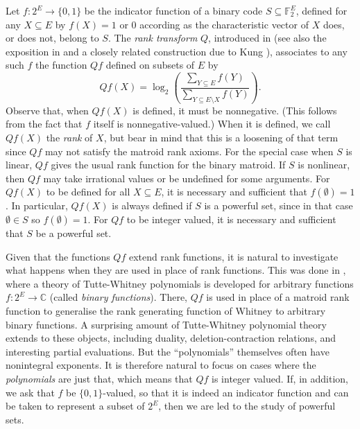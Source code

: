 \documentclass[12pt]{article}
\begin{document}
Let $f:2^E\rightarrow\{0,1\}$ be the indicator function of
a binary code $S\subseteq\mathbb{F}_2^E$, defined
for any $X\subseteq E$ by $f(X)=1$ or 0 according as the characteristic vector of $X$
does, or does not, belong to $S$.  The \textit{rank transform} $Q$, introduced in
\cite{farr93} (see also the exposition in \cite[\S3.6]{farr07a} and a closely related construction
due to Kung \cite{kung80}),
associates to any such $f$ the function $Qf$ defined on subsets of $E$ by
\begin{equation}
\label{eq:Qf}
Qf(X) = \log_2 \left(
\frac{\sum_{Y\subseteq E} f(Y)}{\sum_{Y\subseteq E\setminus X} f(Y)}
\right) .
\end{equation}
Observe that, when $Qf(X)$ is defined, it must be nonnegative.
(This follows from the fact that $f$ itself is nonnegative-valued.)
When it is defined, we call $Qf(X)$ the \textit{rank} of $X$, but bear in mind that this is
a loosening of that term since $Qf$ may not satisfy the matroid rank axioms.
For the special case when $S$ is linear, $Qf$ gives the usual rank function for the
binary matroid.  If $S$ is nonlinear, then $Qf$ may take irrational values
or be undefined for some arguments.
For $Qf(X)$ to be defined for all $X\subseteq E$, it is necessary and sufficient that
$f(\emptyset)=1$.  In particular, $Qf(X)$ is always defined if $S$ is a powerful set,
since in that case $\emptyset\in S$ so $f(\emptyset)=1$.
For $Qf$ to be integer valued, it is necessary and sufficient that $S$ be a powerful set.

Given that the functions $Qf$ extend rank functions, it is natural to investigate
what happens when they are used in place of rank functions.  This was done in
\cite{farr93,farr04}, where a theory of Tutte-Whitney polynomials is developed for
arbitrary functions $f:2^E\rightarrow\mathbb{C}$ (called \textit{binary functions}).
There, $Qf$ is used in place
of a matroid rank function to generalise the rank generating function
of Whitney \cite{whitney32} to arbitrary binary functions.
A surprising amount of Tutte-Whitney polynomial theory
extends to these objects, including duality, deletion-contraction relations, and
interesting partial evaluations.  But the ``polynomials'' themselves often have nonintegral
exponents.  It is therefore natural to focus on cases where the \emph{polynomials} are just
that, which means that $Qf$ is integer valued.  If, in addition, we ask that $f$ be
$\{0,1\}$-valued, so that it is indeed an indicator function and can be taken to represent
a subset of $2^E$, then we are led to the study of powerful sets.
\end{document}
